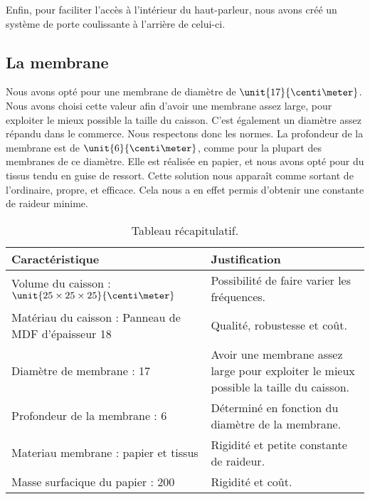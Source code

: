 Enfin, pour faciliter l'accès à l'intérieur du haut-parleur, nous avons créé un système de porte coulissante
à l'arrière de celui-ci.

\subsection{La membrane}
Nous avons opté pour une membrane de diamètre de $\unit{17}{\centi\meter}$. Nous avons choisi cette valeur afin
d'avoir une membrane assez large, pour exploiter le mieux possible la taille du caisson. C'est également un
diamètre assez répandu dans le commerce\cite{tlhp}. Nous respectons donc les normes.
La profondeur de la membrane est de $\unit{6}{\centi\meter}$, comme pour la plupart des membranes de ce
diamètre\cite{tlhp}. Elle est réalisée en papier, et nous avons opté pour du tissus tendu en guise de ressort.
Cette solution nous apparaît comme sortant de l'ordinaire, propre, et efficace. Cela nous a en effet permis
d'obtenir une constante de raideur minime.

\begin{table}[htb!]
	\centering
	\begin{tabularx}{\textwidth}{|X|X|}
	\hline
	\textbf{Caractéristique} & \textbf{Justification} \\
	\hline
	Volume du caisson : $\unit{25\times25\times25}{\centi\meter}$ & Possibilité de faire varier les fréquences. \\
	\hline
	Matériau du caisson : Panneau de MDF
	d'épaisseur \unit{18}{\milli\meter} & Qualité, robustesse et coût. \\
	\hline
	Diamètre de membrane : \unit{17}{\centi\meter} & Avoir une membrane assez large pour exploiter le mieux possible la taille du caisson. \\
	\hline
	Profondeur de la membrane : \unit{6}{\centi\meter} & Déterminé en fonction du diamètre de la membrane. \\
	\hline
	Materiau membrane : papier et tissus & Rigidité et petite constante de raideur. \\
	\hline
	Masse surfacique du papier : \unit{200}{\gram\per\meter\squared} & Rigidité et coût. \\
	\hline
	\end{tabularx}
	\caption{Tableau récapitulatif.}
\end{table}

